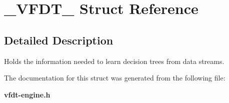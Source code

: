 \section{\_\-VFDT\_\- Struct Reference}
\label{struct__VFDT__}


\subsection{Detailed Description}
Holds the information needed to learn decision trees from data streams. 



The documentation for this struct was generated from the following file:\begin{CompactItemize}
\item 
{\bf vfdt-engine.h}\end{CompactItemize}
